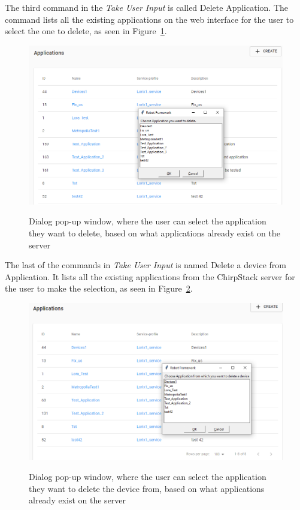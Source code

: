 The third command in the \textit{Take User Input} is called Delete Application.
The command lists all the existing applications on the web interface for the user to select the one to delete, as seen in Figure~\ref{fig:delete_application}.

\begin{figure}[ht]
  \centering
  {\includegraphics[width=\textwidth]{illustration/delete_app_choose_app_dialog_with_applications_on_back.PNG}}
  \caption{Dialog pop-up window, where the user can select the application they want to delete, based on what applications already exist on the server}
  \label{fig:delete_application}
\end{figure}

The last of the commands in \textit{Take User Input} is named Delete a device from Application.
It lists all the existing applications from the ChirpStack server for the user to make the selection, as seen in Figure~\ref{fig:delete_device_select_application}.

\clearpage

\begin{figure}[ht]
  \centering
  {\includegraphics[width=\textwidth]{illustration/delete_device_choose_app_dialog_with_applications_on_back.PNG}}
  \caption{Dialog pop-up window, where the user can select the application they want to delete the device from, based on what applications already exist on the server}
  \label{fig:delete_device_select_application}
\end{figure}

